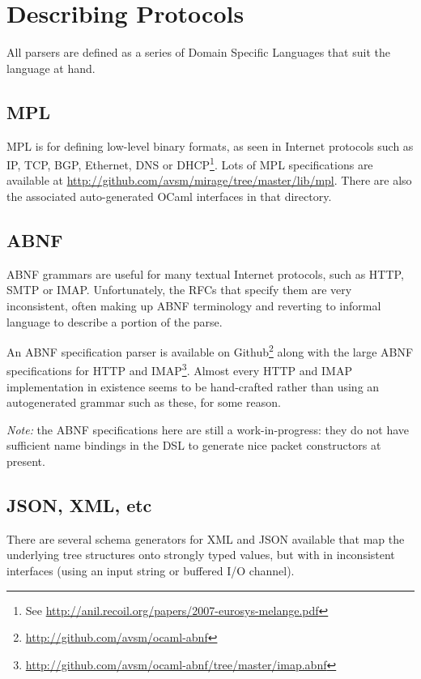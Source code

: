 \documentclass{article}
\begin{document}
\section{Describing Protocols}

All parsers are defined  as a series of Domain Specific Languages that suit the language at hand.

\subsection{MPL}

MPL is for defining low-level binary formats, as seen in Internet protocols such as IP, TCP, BGP, Ethernet, DNS or DHCP\footnote{See \url{http://anil.recoil.org/papers/2007-eurosys-melange.pdf}}. Lots of MPL specifications are available at \url{http://github.com/avsm/mirage/tree/master/lib/mpl}.  There are also the associated auto-generated OCaml interfaces in that directory.

\subsection{ABNF}

ABNF grammars are useful for many textual Internet protocols, such as HTTP, SMTP or IMAP.  Unfortunately, the RFCs that specify them are very inconsistent, often making up ABNF terminology and reverting to informal language to describe a portion of the parse.

An ABNF specification parser is available on Github\footnote{\url{http://github.com/avsm/ocaml-abnf}} along with the large ABNF specifications for HTTP and IMAP\footnote{\url{http://github.com/avsm/ocaml-abnf/tree/master/imap.abnf}}.  Almost every HTTP and IMAP implementation in existence seems to be hand-crafted rather than using an autogenerated grammar such as these, for some reason.

{\em Note:} the ABNF specifications here are still a work-in-progress: they do not have sufficient name bindings in the DSL to generate nice packet constructors at present.

\subsection{JSON, XML, etc}

There are several schema generators for XML and JSON available that map the underlying tree structures onto strongly typed values, but with in inconsistent interfaces (using an input string or buffered I/O channel).
\end{document}

